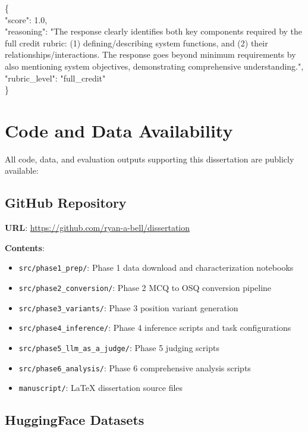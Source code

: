 \begin{tcolorbox}[title=LLM Judge Output (GPT-4o, Rubric-Based)]
\{\\
\quad "score": 1.0,\\
\quad "reasoning": "The response clearly identifies both key components required by the full credit rubric: (1) defining/describing system functions, and (2) their relationships/interactions. The response goes beyond minimum requirements by also mentioning system objectives, demonstrating comprehensive understanding.",\\
\quad "rubric\_level": "full\_credit"\\
\}
\end{tcolorbox}

\section{Code and Data Availability}\label{app:code}

All code, data, and evaluation outputs supporting this dissertation are publicly available:

\subsection{GitHub Repository}

\textbf{URL}: \url{https://github.com/ryan-a-bell/dissertation}

\textbf{Contents}:
\begin{itemize}
    \item \texttt{src/phase1\_prep/}: Phase 1 data download and characterization notebooks
    \item \texttt{src/phase2\_conversion/}: Phase 2 MCQ to OSQ conversion pipeline
    \item \texttt{src/phase3\_variants/}: Phase 3 position variant generation
    \item \texttt{src/phase4\_inference/}: Phase 4 inference scripts and task configurations
    \item \texttt{src/phase5\_llm\_as\_a\_judge/}: Phase 5 judging scripts
    \item \texttt{src/phase6\_analysis/}: Phase 6 comprehensive analysis scripts
    \item \texttt{manuscript/}: LaTeX dissertation source files
\end{itemize}

\subsection{HuggingFace Datasets}

